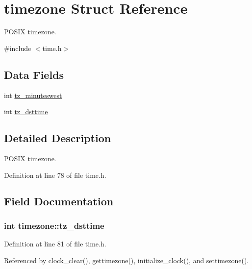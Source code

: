 \hypertarget{structtimezone}{}\section{timezone Struct Reference}
\label{structtimezone}


P\+O\+S\+IX timezone.  




{\ttfamily \#include $<$time.\+h$>$}

\subsection*{Data Fields}
\begin{DoxyCompactItemize}
\item 
int \hyperlink{structtimezone_a3042f7eff6e1b980728def76b1fa0eb7}{tz\+\_\+minuteswest}
\item 
int \hyperlink{structtimezone_a85259977aeb63b17e6ce94f19afdfd99}{tz\+\_\+dsttime}
\end{DoxyCompactItemize}


\subsection{Detailed Description}
P\+O\+S\+IX timezone. 

Definition at line 78 of file time.\+h.



\subsection{Field Documentation}
\subsubsection[{\texorpdfstring{tz\+\_\+dsttime}{tz_dsttime}}]{\setlength{\rightskip}{0pt plus 5cm}int timezone\+::tz\+\_\+dsttime}\hypertarget{structtimezone_a85259977aeb63b17e6ce94f19afdfd99}{}\label{structtimezone_a85259977aeb63b17e6ce94f19afdfd99}


Definition at line 81 of file time.\+h.



Referenced by clock\+\_\+clear(), gettimezone(), initialize\+\_\+clock(), and settimezone().

